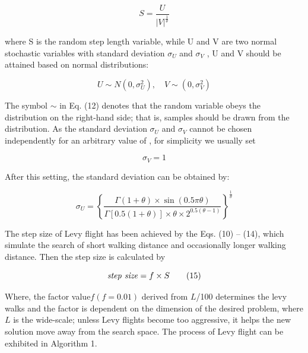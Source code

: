 \documentclass[
]{article}
\begin{document}
\begin{justify}
{\begin{equation}
S = \frac{U}{|V|^\frac{1}{\theta}} \tag{11}
\end{equation}

where S is the random step length variable, while U and V are two normal stochastic variables with standard deviation \(\sigma _U\)
 and \(\sigma _V\)
, U and V should be attained based on normal distributions:

\begin{equation}
U \sim N\left(0, \sigma_U^2\right), \quad V \sim \left(0, \sigma_V^2\right) \tag{12}
\end{equation}

The symbol \(\sim\)
 in Eq. (12) denotes that the random variable obeys the distribution on the right-hand side; that is, samples should be drawn from the distribution. As the standard deviation \(\sigma _U\)
 and \(\sigma _V\)
 cannot be chosen independently for an arbitrary value of 
, for simplicity we usually set

\begin{equation}
\sigma_V = 1 \tag{13}
\end{equation}

After this setting, the standard deviation 
 can be obtained by:

\begin{equation}
\sigma_{U} = \left\{ \frac{\Gamma(1 + \theta) \times \sin(0.5\pi \theta)}{\Gamma\left[0.5\left(1 + \theta\right)\right]\times \theta \times 2^{0.5(\theta - 1)}} \right\}^{\frac{1}{\theta}} \tag{14}
\end{equation}

The step size of Levy flight has been achieved by the Eqs. (10) – (14), which simulate the search of short walking distance and occasionally longer walking distance. Then the step size is calculated by

\begin{equation}
\text{\textit{step size}} = f \times S \tag{15}
\end{equation}

Where, the factor value\( f(f=0.01)\)
 derived from \(L\)/100 determines the levy walks and the factor is dependent on the dimension of the desired problem, where \(L\) is the wide-scale; unless Levy flights become too aggressive, it helps the new solution move away from the search space. The process of Levy flight can be exhibited in Algorithm 1.

}
\end{justify}
\end{document}
